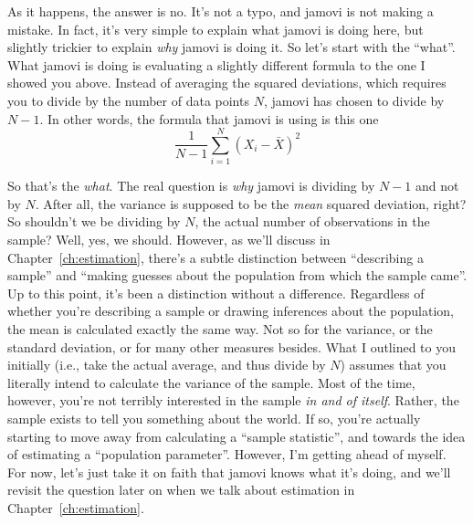 As it happens, the answer is no. It's not a typo, and jamovi is not making a mistake. In fact, it's very simple to explain what jamovi is doing here, but slightly trickier to explain {\it why} jamovi is doing it. So let's start with the ``what''. What jamovi is doing is evaluating a slightly different formula to the one I showed you above. Instead of averaging the squared deviations, which requires you to divide by the number of data points $N$, jamovi has chosen to divide by $N-1$. In other words, the formula that jamovi is using is this one  
$$
\frac{1}{N-1} \sum_{i=1}^N \left( X_i - \bar{X} \right)^2
$$

 So that's the {\it what}. The real question is {\it why} jamovi is dividing by $N-1$ and not by $N$. After all, the variance is supposed to be the {\it mean} squared deviation, right? So shouldn't we be dividing by $N$, the actual number of observations in the sample? Well, yes, we should. However, as we'll discuss in Chapter~\ref{ch:estimation}, there's a subtle distinction between ``describing a sample'' and ``making guesses about the population from which the sample came''. Up to this point, it's been a distinction without a difference. Regardless of whether you're describing a sample or drawing inferences about the population, the mean is calculated exactly the same way. Not so for the variance, or the standard deviation, or for many other measures besides. What I outlined to you initially (i.e., take the actual average, and thus divide by $N$) assumes that you literally intend to calculate the variance of the sample. Most of the time, however, you're not terribly interested in the sample {\it in and of itself}. Rather, the sample exists to tell you something about the world. If so, you're actually starting to move away from calculating a ``sample statistic'', and towards the idea of estimating a ``population parameter''. However, I'm getting ahead of myself. For now, let's just take it on faith that jamovi knows what it's doing, and we'll revisit the question later on when we talk about estimation in Chapter~\ref{ch:estimation}. 

